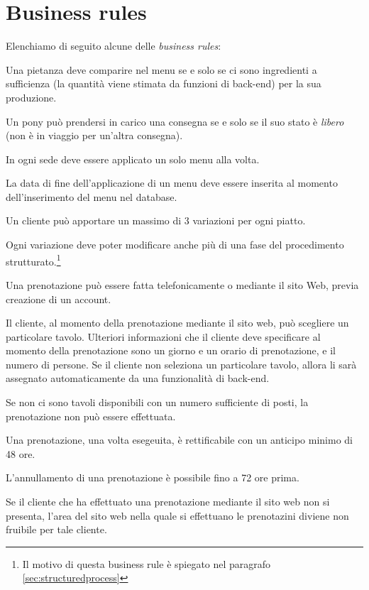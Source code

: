 \section{Business rules} \label{sec:businessrules}
Elenchiamo di seguito alcune delle {\it business rules}:
\begin{enumbusinessrules}
\item Una pietanza deve comparire nel menu se e solo se ci sono ingredienti a sufficienza (la quantità viene stimata da funzioni di back-end) per la sua produzione.
\item Un pony può prendersi in carico una consegna se e solo se il suo stato è {\it libero} (non è in viaggio per un'altra consegna).
\item In ogni sede deve essere applicato un solo menu alla volta.
\item\label{br.menuenddate} La data di fine dell'applicazione di un menu deve essere inserita al momento dell'inserimento del menu nel database.
\item Un cliente può apportare un massimo di 3 variazioni per ogni piatto.
\item\label{br.variations} Ogni variazione deve poter modificare anche più di una fase del procedimento strutturato.\footnote{Il motivo di questa business rule è spiegato nel paragrafo \vref{sec:structuredprocess}}
\item Una prenotazione può essere fatta telefonicamente o mediante il sito Web, previa creazione di un account.
\item Il cliente, al momento della prenotazione mediante il sito web, può scegliere un particolare tavolo. Ulteriori informazioni che il cliente deve specificare al momento della prenotazione sono un giorno e un
orario di prenotazione, e il numero di persone. Se il cliente non seleziona un particolare tavolo, allora li sarà assegnato automaticamente da una funzionalità di back-end.
\item Se non ci sono tavoli disponibili con un numero sufficiente di posti, la prenotazione non può essere effettuata.
\item Una prenotazione, una volta esegeuita, è rettificabile con un anticipo minimo di 48 ore.
\item L'annullamento di una prenotazione è possibile fino a 72 ore prima.
\item Se il cliente che ha effettuato una prenotazione mediante il sito web non si presenta, l'area del sito web nella quale si effettuano le prenotazini diviene non fruibile per tale cliente.
\end{enumbusinessrules}

